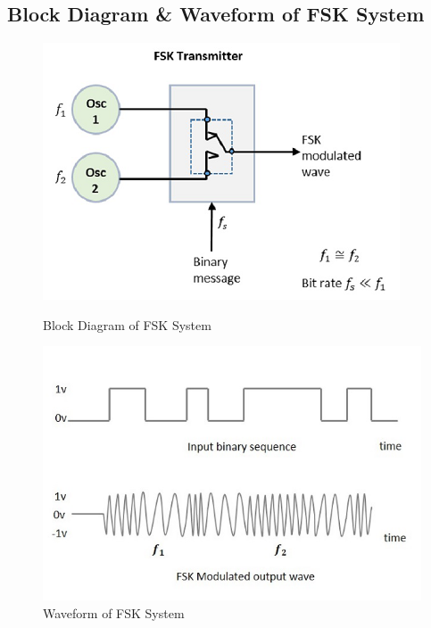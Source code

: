 \documentclass[12pt]{article}
\begin{document}
\subsection*{Block Diagram \& Waveform of FSK System}
\begin{figure}[H]
    \centering
    \begin{multicols}{2}
        \includegraphics[width=.95\linewidth]{fsk_modulator.png}
        \caption{Block Diagram of FSK System}
        \label{fig:fsk_modulator}

        \includegraphics[width=.95\linewidth]{fsk_modulated_waveform.jpg}
        \caption{Waveform of FSK System}
        \label{fig:fsk_waveform}
    \end{multicols}
\end{figure}
\end{document}
